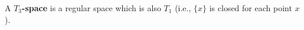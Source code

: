 A \textbf{$T_3$-space} is a regular space which is also $T_1$ (i.e., $\{x\}$ is closed for each point $x$).
